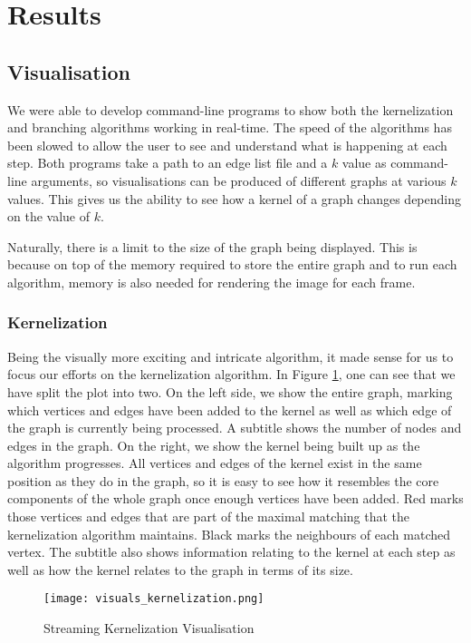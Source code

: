 \section{Results}

\subsection{Visualisation}

We were able to develop command-line programs to show both the kernelization
and branching algorithms working in real-time. The speed of the algorithms has
been slowed to allow the user to see and understand what is happening at each
step. Both programs take a path to an edge list file and a \(k\) value as
command-line arguments, so visualisations can be produced of different graphs
at various \(k\) values. This gives us the ability to see how a kernel of a
graph changes depending on the value of \(k\).

Naturally, there is a limit to the size of the graph being displayed. This is
because on top of the memory required to store the entire graph and to run each
algorithm, memory is also needed for rendering the image for each frame.

\subsubsection{Kernelization}

Being the visually more exciting and intricate algorithm, it made sense for us
to focus our efforts on the kernelization algorithm. In Figure
\ref{fig:kernelization_visualisation}, one can see that we have split the plot
into two. On the left side, we show the entire graph, marking which vertices
and edges have been added to the kernel as well as which edge of the graph is
currently being processed. A subtitle shows the number of nodes and edges in
the graph. On the right, we show the kernel being built up as the algorithm
progresses. All vertices and edges of the kernel exist in the same position as
they do in the graph, so it is easy to see how it resembles the core components
of the whole graph once enough vertices have been added. Red marks those
vertices and edges that are part of the maximal matching that the kernelization
algorithm maintains. Black marks the neighbours of each matched vertex. The
subtitle also shows information relating to the kernel at each step as well as
how the kernel relates to the graph in terms of its size.

\begin{figure}[htb]
    \centering
    \texttt{[image: visuals\_kernelization.png]}
    \caption{Streaming Kernelization Visualisation}
    \label{fig:kernelization_visualisation}
\end{figure}

